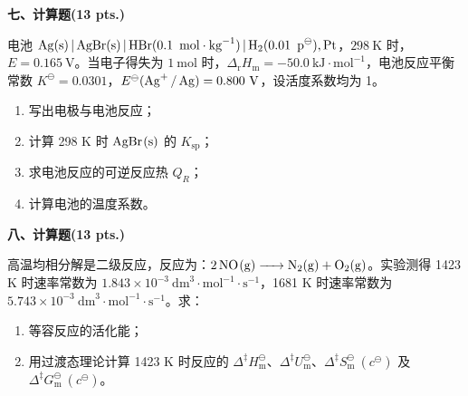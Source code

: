 \vspace{0.5cm}
\noindent\textbf{七、计算题(13 pts.)}

电池 $\ce{Ag(s) | AgBr(s) | HBr(0.1\ mol\cdot kg^{-1}) | H2(0.01\ p^\ominus), Pt}$，$298\ \text{K}$ 时，$E = 0.165\ \text{V}$。当电子得失为 $1\ \text{mol}$ 时，$\Delta_\text{r} H_\text{m} = -50.0\ \text{kJ}\cdot\text{mol}^{-1}$，电池反应平衡常数 $K^\ominus = 0.0301$，$E^\ominus(\ce{Ag+ / Ag}) = 0.800\ \text{V}$，设活度系数均为 1。
\begin{enumerate}[label=（\arabic*）, itemsep=1ex]
    \item 写出电极与电池反应；
    \item 计算 298 K 时 $\ce{AgBr(s)}$ 的 $K_\text{sp}$；
    \item 求电池反应的可逆反应热 $Q_R$；
    \item 计算电池的温度系数。
\end{enumerate}

\vspace{0.5cm}
\noindent\textbf{八、计算题(13 pts.)}

 高温均相分解是二级反应，反应为：$\ce{2NO(g) -> N2(g) + O2(g)}$。实验测得 1423 K 时速率常数为 $1.843 \times 10^{-3}\ \text{dm}^3\cdot\text{mol}^{-1}\cdot\text{s}^{-1}$，1681 K 时速率常数为 $5.743 \times 10^{-3}\ \text{dm}^3\cdot\text{mol}^{-1}\cdot\text{s}^{-1}$。求：
\begin{enumerate}[label=（\arabic*）, itemsep=1ex]
    \item 等容反应的活化能；
    \item 用过渡态理论计算 1423 K 时反应的 $\Delta^\ddagger H_\text{m}^\ominus$、$\Delta^\ddagger U_\text{m}^\ominus$、$\Delta^\ddagger S_\text{m}^\ominus\ (c^\ominus)$ 及 $\Delta^\ddagger G_\text{m}^\ominus\ (c^\ominus)$。
\end{enumerate}